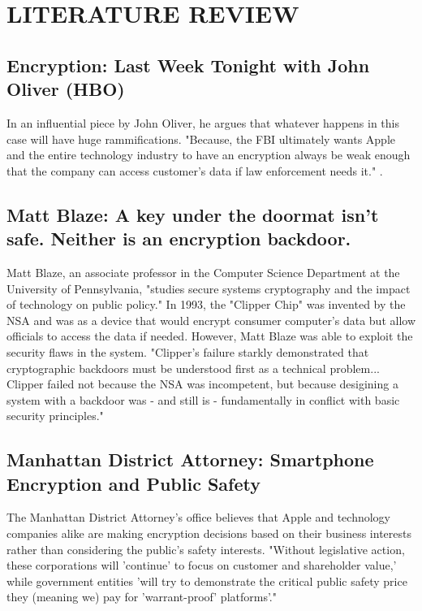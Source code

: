 \section{LITERATURE REVIEW}
\subsection{Encryption: Last Week Tonight with John Oliver (HBO)}
In an influential piece by John Oliver, he argues that whatever happens in this case will have huge rammifications. "Because, the FBI ultimately wants Apple and the entire technology industry to have an encryption always be weak enough that the company can access customer's data if law enforcement needs it." \cite{John-Oliver}.

\subsection{Matt Blaze: A key under the doormat isn't safe. Neither is an encryption backdoor.}
Matt Blaze, an associate professor in the Computer Science Department at the University of Pennsylvania, "studies secure systems cryptography and the impact of technology on public policy." In 1993, the "Clipper Chip" was invented by the NSA and was as a device that would encrypt consumer computer's data but allow officials to access the data if needed. However, Matt Blaze was able to exploit the security flaws in the system. "Clipper's failure starkly demonstrated that cryptographic backdoors must be understood first as a technical problem... Clipper failed not because the NSA was incompetent, but because desigining a system with a backdoor was - and still is - fundamentally in conflict with basic security principles." \cite{WashingtonBlaze}

\subsection{Manhattan District Attorney: Smartphone Encryption and Public Safety}
The Manhattan District Attorney's office believes that Apple and technology companies alike are making encryption decisions based on their business interests rather than considering the public's safety interests. "Without legislative action, these corporations will 'continue' to focus on customer and shareholder value,' while government entities 'will try to demonstrate the critical public safety price they (meaning we) pay for 'warrant-proof' platforms'." \cite{Manhattan-da}


\vspace{0.4cm}